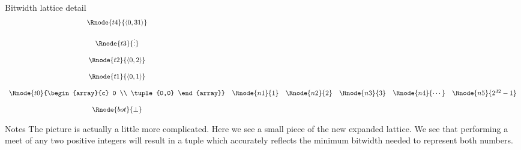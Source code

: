 \documentclass[%
pdf,
colorBG,
slideColor,
nototal,
oqe
]{prosper}
\newenvironment{talknotes}{\begin{slide}{Notes}\tiny}{\end{slide}}
\begin{document}
\begin{slide}{Bitwidth lattice detail}
\begin{displaymath}
\begin{array}{cccccc}
\Rnode{t4}{\tuple{0,31}}\\ \\
\Rnode{t3}{\vdots}\\ \\
\Rnode{t2}{\tuple{0,2}}\\ \\
\Rnode{t1}{\tuple{0,1}}\\ \\
\Rnode{t0}{\begin{array}{c} 0 \\ \tuple{0,0} \end{array}} &
\Rnode{n1}{1} &
\Rnode{n2}{2} &
\Rnode{n3}{3} &
\Rnode{n4}{\cdots} &
\Rnode{n5}{2^{32}-1} \\ \\
\Rnode{bot}{\bot} \\
\end{array}
\end{displaymath}
\ifDVItoPS\else{}\fi
{}

\end{slide}

\begin{talknotes}
The picture is actually a little more complicated.  Here we see
a small piece of the new expanded lattice.  We see that performing a
meet of any two positive integers will result in a tuple which
accurately reflects the minimum bitwidth needed to represent both
numbers.
\end{talknotes}
\end{document}
